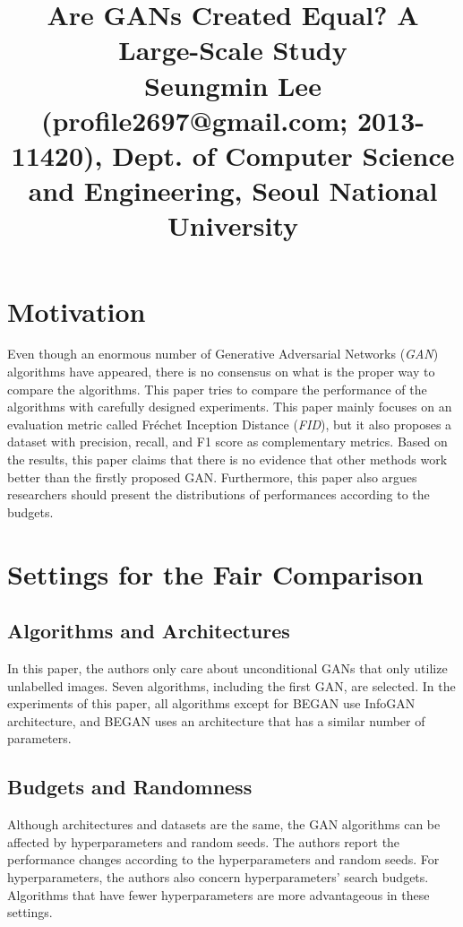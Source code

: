\documentclass[10pt,twocolumn,letterpaper]{article}
\begin{document}
\title{Are GANs Created Equal? A Large-Scale Study
	 \\ {\rm {\normalsize Seungmin Lee (profile2697@gmail.com; 2013-11420), Dept. of Computer Science and Engineering, Seoul National University}}} 

\maketitle
\thispagestyle{empty}


\section{Motivation}
\vspace{-0.2cm}
Even though an enormous number of Generative Adversarial Networks (\textit{GAN}) algorithms have appeared, there is no consensus on what is the proper way to compare the algorithms. This paper tries to compare the performance of the algorithms with carefully designed experiments. This paper mainly focuses on an evaluation metric called Fréchet Inception Distance (\textit{FID}), but it also proposes a dataset with precision, recall, and F1 score as complementary metrics. Based on the results, this paper claims that there is no evidence that other methods work better than the firstly proposed GAN. Furthermore, this paper also argues researchers should present the distributions of performances according to the budgets.
\vspace{-0.2cm}
\section{Settings for the Fair Comparison}
\vspace{-0.2cm}
\subsection{Algorithms and Architectures}
\vspace{-0.2cm}
In this paper, the authors only care about unconditional GANs that only utilize unlabelled images. Seven algorithms, including the first GAN, are selected. In the experiments of this paper, all algorithms except for BEGAN use InfoGAN architecture, and BEGAN uses an architecture that has a similar number of parameters. 

\subsection{Budgets and Randomness}
\vspace{-0.2cm}
Although architectures and datasets are the same, the GAN algorithms can be affected by hyperparameters and random seeds. The authors report the performance changes according to the hyperparameters and random seeds. For hyperparameters, the authors also concern hyperparameters' search budgets. Algorithms that have fewer hyperparameters are more advantageous in these settings.
\end{document}
